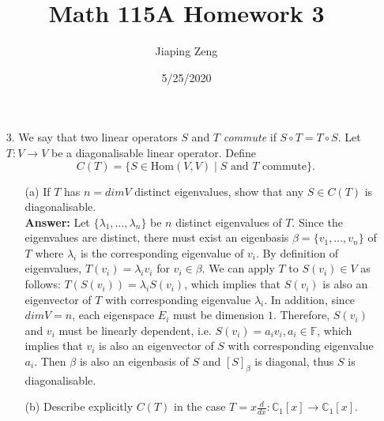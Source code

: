 \documentclass{article}
\title{Math 115A Homework 3}
\date{5/25/2020}
\author{Jiaping Zeng}
\begin{document}
\maketitle

\begin{itemize}
	\item [3.] We say that two linear operators $S$ and $T$ \textit{commute} if $S\circ T=T\circ S$. Let $T:V\rightarrow V$ be a diagonalisable linear operator. Define \[C(T)=\{S\in\text{Hom}(V,V)\mid S\text{ and }T\text{ commute}\}.\]
	      \begin{itemize}
		      \item [(a)] If $T$ has $n=dim V$ distinct eigenvalues, show that any $S\in C(T)$ is diagonalisable.\\
		            \textbf{Answer: } Let $\{\lambda_1,\ldots,\lambda_n\}$ be $n$ distinct eigenvalues of $T$. Since the eigenvalues are distinct, there must exist an eigenbasis $\beta=\{v_1,\ldots,v_n\}$ of $T$ where $\lambda_i$ is the corresponding eigenvalue of $v_i$. By definition of eigenvalues, $T(v_i)=\lambda_iv_i$ for $v_i\in\beta$. We can apply $T$ to $S(v_i)\in V$ as follows: $T(S(v_i))=\lambda_iS(v_i)$, which implies that $S(v_i)$ is also an eigenvector of $T$ with corresponding eigenvalue $\lambda_i$. In addition, since $dim V=n$, each eigenspace $E_i$ must be dimension $1$. Therefore, $S(v_i)$ and $v_i$ must be linearly dependent, i.e. $S(v_i)=a_iv_i, a_i\in\mathbb{F}$, which implies that $v_i$ is also an eigenvector of $S$ with corresponding eigenvalue $a_i$. Then $\beta$ is also an eigenbasis of $S$ and $[S]_\beta$ is diagonal, thus $S$ is diagonalisable.
		      \item [(b)] Describe explicitly $C(T)$ in the case $T=x\frac{d}{dx}:\mathbb{C}_1[x]\rightarrow\mathbb{C}_1[x]$.\\

\end{itemize}
\end{itemize}
\end{document}
